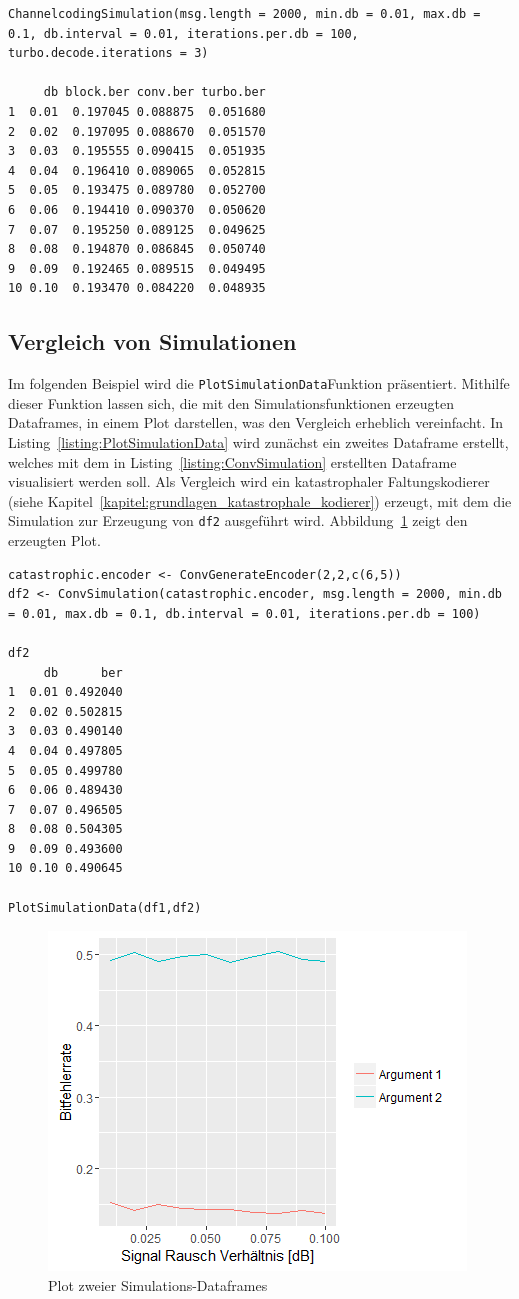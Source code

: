 \begin{lstlisting}[caption=Kanalkodierungs-Simulation, label={listing:ChannelcodingSimulation}, float=!th]
ChannelcodingSimulation(msg.length = 2000, min.db = 0.01, max.db = 0.1, db.interval = 0.01, iterations.per.db = 100, turbo.decode.iterations = 3)

     db block.ber conv.ber turbo.ber
1  0.01  0.197045 0.088875  0.051680
2  0.02  0.197095 0.088670  0.051570
3  0.03  0.195555 0.090415  0.051935
4  0.04  0.196410 0.089065  0.052815
5  0.05  0.193475 0.089780  0.052700
6  0.06  0.194410 0.090370  0.050620
7  0.07  0.195250 0.089125  0.049625
8  0.08  0.194870 0.086845  0.050740
9  0.09  0.192465 0.089515  0.049495
10 0.10  0.193470 0.084220  0.048935
\end{lstlisting}

\subsection{Vergleich von Simulationen}
\label{kapitel:beispiele_simulation_vergleich}
Im folgenden Beispiel wird die \texttt{PlotSimulationData}\-Funktion präsentiert. Mithilfe dieser Funktion lassen sich, die mit den Simulationsfunktionen erzeugten Dataframes, in einem Plot darstellen, was den Vergleich erheblich vereinfacht. In Listing~\ref{listing:PlotSimulationData} wird zunächst ein zweites Dataframe erstellt, welches mit dem in Listing~\ref{listing:ConvSimulation} erstellten Dataframe visualisiert werden soll. Als Vergleich wird ein katastrophaler Faltungskodierer (siehe Kapitel~\ref{kapitel:grundlagen_katastrophale_kodierer}) erzeugt, mit dem die Simulation zur Erzeugung von \texttt{df2} ausgeführt wird. Abbildung~\ref{abb:PlotSimulationData} zeigt den erzeugten Plot.

\begin{lstlisting}[caption=Vergleich mehrerer Simulationsdaten, label={listing:PlotSimulationData}, float=!th]
catastrophic.encoder <- ConvGenerateEncoder(2,2,c(6,5))
df2 <- ConvSimulation(catastrophic.encoder, msg.length = 2000, min.db = 0.01, max.db = 0.1, db.interval = 0.01, iterations.per.db = 100)

df2
     db      ber
1  0.01 0.492040
2  0.02 0.502815
3  0.03 0.490140
4  0.04 0.497805
5  0.05 0.499780
6  0.06 0.489430
7  0.07 0.496505
8  0.08 0.504305
9  0.09 0.493600
10 0.10 0.490645

PlotSimulationData(df1,df2)
\end{lstlisting}

\begin{figure}[!ht]
	\centering
	\includegraphics[width=\ScaleIfNeeded]{abbildungen/Rplot_PlotSimulationData}
	\caption{Plot zweier Simulations-Dataframes}
	\label{abb:PlotSimulationData}
\end{figure}